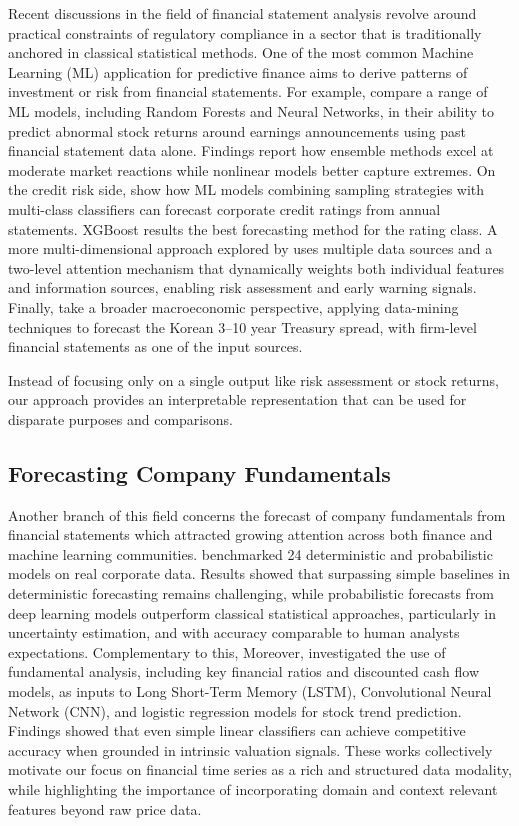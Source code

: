 \documentclass[a4paper,fleqn]{cas-dc}
\begin{document}
Recent discussions in the field of financial statement analysis revolve around practical constraints of regulatory compliance in a sector that is traditionally anchored in classical statistical methods.
One of the most common Machine Learning (ML) application for predictive finance aims to derive patterns of investment or risk from financial statements. For example, \citet{amel-zadeh_machine_2020} compare a range of ML models, including Random Forests and Neural Networks, in their ability to predict abnormal stock returns around earnings announcements using past financial statement data alone. Findings report how ensemble methods excel at moderate market reactions while nonlinear models better capture extremes. On the credit risk side, \citet{pamuk_opening_2023} show how ML models combining sampling strategies with multi-class classifiers can forecast corporate credit ratings from annual statements. XGBoost results the best forecasting method for the rating class. A more multi-dimensional approach explored by \cite{chen_deep_2025} uses multiple data sources and a two-level attention mechanism that dynamically weights both individual features and information sources, enabling risk assessment and early warning signals. Finally, \cite{kim_data_2021} take a broader macroeconomic perspective, applying data-mining techniques to forecast the Korean 3–10 year Treasury spread, with firm-level financial statements as one of the input sources.

Instead of focusing only on a single output like risk assessment or stock returns, our approach provides an interpretable representation that can be used for disparate purposes and comparisons.


\subsection{Forecasting Company Fundamentals}

Another branch of this field concerns the forecast of company fundamentals from financial statements which attracted growing attention across both finance and machine learning communities. \citet{divo_forecasting_2025} benchmarked 24 deterministic and probabilistic models on real corporate data. Results showed that surpassing simple baselines in deterministic forecasting remains challenging, while probabilistic forecasts from deep learning models outperform classical statistical approaches, particularly in uncertainty estimation, and with accuracy comparable to human analysts expectations. Complementary to this, Moreover, \citet{phan_leveraging_2024} investigated the use of fundamental analysis, including key financial ratios and discounted cash flow models, as inputs to Long Short-Term Memory (LSTM), Convolutional Neural Network (CNN), and logistic regression models for stock trend prediction. Findings showed that even simple linear classifiers can achieve competitive accuracy when grounded in intrinsic valuation signals. These works collectively motivate our focus on financial time series as a rich and structured data modality, while highlighting the importance of incorporating domain and context relevant features beyond raw price data.
\end{document}
